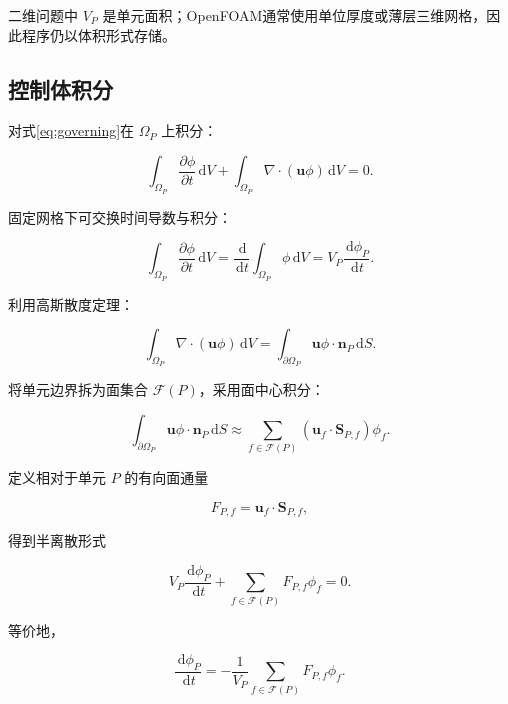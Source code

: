 \documentclass[UTF8,12pt,a4paper,fontset=fandol]{ctexart}
\numberwithin{equation}{section}
\newcommand{\dd}{\,\mathrm d}
\newcommand{\Sf}{\bm S}
\begin{document}
二维问题中 $V_P$ 是单元面积；OpenFOAM通常使用单位厚度或薄层三维网格，因此程序仍以体积形式存储。

\subsection{控制体积分}

对式\eqref{eq:governing}在 $\Omega_P$ 上积分：

\begin{equation}
  \int_{\Omega_P}
  \frac{\partial\phi}{\partial t}\dd V
  +
  \int_{\Omega_P}
  \nabla\cdot(\bm u\phi)\dd V
  =0.
\end{equation}

固定网格下可交换时间导数与积分：

\begin{equation}
  \int_{\Omega_P}
  \frac{\partial\phi}{\partial t}\dd V
  =
  \frac{\dd}{\dd t}
  \int_{\Omega_P}\phi\dd V
  =
  V_P\frac{\dd\phi_P}{\dd t}.
\end{equation}

利用高斯散度定理：

\begin{equation}
  \int_{\Omega_P}
  \nabla\cdot(\bm u\phi)\dd V
  =
  \int_{\partial\Omega_P}
  \bm u\phi\cdot\bm n_P\dd S.
\end{equation}

将单元边界拆为面集合 $\mathcal F(P)$，采用面中心积分：

\begin{equation}
  \int_{\partial\Omega_P}
  \bm u\phi\cdot\bm n_P\dd S
  \approx
  \sum_{f\in\mathcal F(P)}
  (\bm u_f\cdot\Sf_{P,f})\phi_f.
\end{equation}

定义相对于单元 $P$ 的有向面通量

\begin{equation}
  F_{P,f}
  =
  \bm u_f\cdot\Sf_{P,f},
\end{equation}

得到半离散形式

\begin{equation}
  \boxed{
  V_P\frac{\dd\phi_P}{\dd t}
  +
  \sum_{f\in\mathcal F(P)}
  F_{P,f}\phi_f
  =0
  }.
  \label{eq:semidiscrete}
\end{equation}

等价地，

\begin{equation}
  \boxed{
  \frac{\dd\phi_P}{\dd t}
  =
  -\frac1{V_P}
  \sum_{f\in\mathcal F(P)}
  F_{P,f}\phi_f
  }.
\end{equation}
\end{document}
